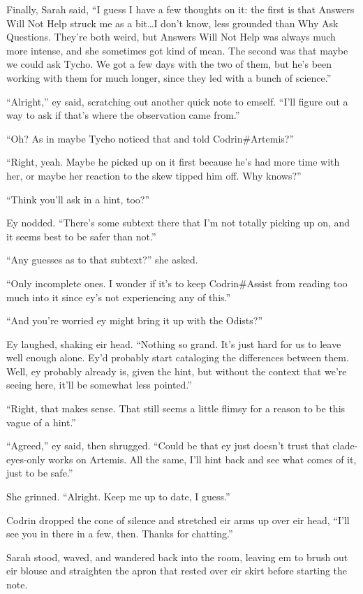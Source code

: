 Finally, Sarah said, ``I guess I have a few thoughts on it: the first is that Answers Will Not Help struck me as a bit\ldots I don't know, less grounded than Why Ask Questions. They're both weird, but Answers Will Not Help was always much more intense, and she sometimes got kind of mean. The second was that maybe we could ask Tycho. We got a few days with the two of them, but he's been working with them for much longer, since they led with a bunch of science.''

``Alright,'' ey said, scratching out another quick note to emself. ``I'll figure out a way to ask if that's where the observation came from.''

``Oh? As in maybe Tycho noticed that and told Codrin\#Artemis?''

``Right, yeah. Maybe he picked up on it first because he's had more time with her, or maybe her reaction to the skew tipped him off. Why knows?''

``Think you'll ask in a hint, too?''

Ey nodded. ``There's some subtext there that I'm not totally picking up on, and it seems best to be safer than not.''

``Any guesses as to that subtext?'' she asked.

``Only incomplete ones. I wonder if it's to keep Codrin\#Assist from reading too much into it since ey's not experiencing any of this.''

``And you're worried ey might bring it up with the Odists?''

Ey laughed, shaking eir head. ``Nothing so grand. It's just hard for us to leave well enough alone. Ey'd probably start cataloging the differences between them. Well, ey probably already is, given the hint, but without the context that we're seeing here, it'll be somewhat less pointed.''

``Right, that makes sense. That still seems a little flimsy for a reason to be this vague of a hint.''

``Agreed,'' ey said, then shrugged. ``Could be that ey just doesn't trust that clade-eyes-only works on Artemis. All the same, I'll hint back and see what comes of it, just to be safe.''

She grinned. ``Alright. Keep me up to date, I guess.''

Codrin dropped the cone of silence and stretched eir arms up over eir head, ``I'll see you in there in a few, then. Thanks for chatting.''

Sarah stood, waved, and wandered back into the room, leaving em to brush out eir blouse and straighten the apron that rested over eir skirt before starting the note.

